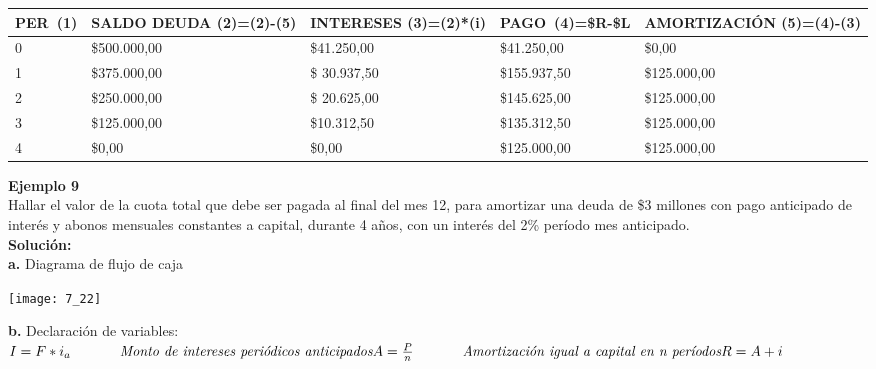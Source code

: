\begin{spacing}{1.1}
    \begin{center}
        \begin{tabular}{|p{1cm}|p{2cm}|p{2cm}|p{2cm}|p{3cm}|}
        \hline 
        \rowcolor{white!50}
            \textbf{PER\ (1)} & \textbf{SALDO DEUDA (2)=(2)-(5)} & \textbf{INTERESES  (3)=(2)*(i)}& \textbf{PAGO\ (4)=\$R-\$L }& \textbf{AMORTIZACIÓN  (5)=(4)-(3)} \\ \hline                        

            0 & \$500.000,00 & \$41.250,00 & \$41.250,00 & \$0,00 \\ \hline 
            1 & \$375.000,00  &\$ 30.937,50  & \$155.937,50  & \$125.000,00 \\ \hline
            2 & \$250.000,00  &\$ 20.625,00  & \$145.625,00  & \$125.000,00 \\ \hline
            3 & \$125.000,00 & \$10.312,50  & \$135.312,50 & \$125.000,00 \\ \hline
            4 & \$0,00  & \$0,00  & \$125.000,00  & \$125.000,00\\ \hline
          

 
\end{tabular}
\end{center}
\end{spacing}



\textbf{Ejemplo 9}\\
Hallar el valor de la cuota total que debe ser pagada al final del mes 12, para amortizar una deuda de \$3 millones con pago anticipado de interés y abonos mensuales constantes a capital, durante 4 años, con un interés del 2\% período mes anticipado.\\

\textbf{Solución: }\\
\textbf{a.}	Diagrama de flujo de caja
\begin{center}
	\texttt{[image: 7\_22]}
\end{center}
\textbf{b.}	Declaración de variables:\\


	$I=F*i_{a} \hspace{35 pt} \textit{Monto de intereses periódicos anticipados}\\
	A=\frac{P}{n} \hspace{35 pt} \textit{Amortización igual a capital en n períodos}\\
	R=A+i$ \\


